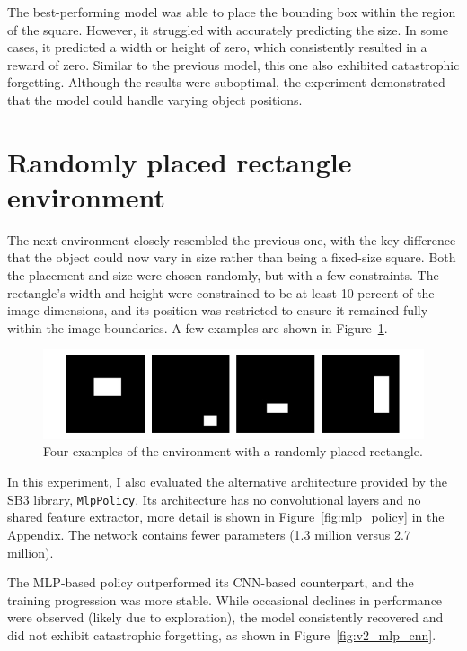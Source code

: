 \documentclass[
  digital,     %
  oneside,     %
  nosansbold,  %
  nocolorbold, %
  lof,         %
  lot,         %
]{fithesis4}
\begin{document}
The best-performing model was able to place the bounding box within the region of the square. However, it struggled with accurately predicting the size. In some cases, it predicted a width or height of zero, which consistently resulted in a reward of zero. Similar to the previous model, this one also exhibited catastrophic forgetting. Although the results were suboptimal, the experiment demonstrated that the model could handle varying object positions.

\section{Randomly placed rectangle environment}
\label{sec:moving_rectangle}
The next environment closely resembled the previous one, with the key difference that the object could now vary in size rather than being a fixed-size square. Both the placement and size were chosen randomly, but with a few constraints. The rectangle’s width and height were constrained to be at least 10 percent of the image dimensions, and its position was restricted to ensure it remained fully within the image boundaries. A few examples are shown in Figure~\ref{fig:env2}.

\begin{figure}
    \includegraphics[width=1\linewidth]{env_examples/env2.pdf}
    \caption{Four examples of the environment with a randomly placed rectangle.}
    \label{fig:env2}
\end{figure}

In this experiment, I also evaluated the alternative architecture provided by the SB3 library, \texttt{MlpPolicy}. Its architecture has no convolutional layers and no shared feature extractor, more detail is shown in Figure~\ref{fig:mlp_policy} in the Appendix. The network contains fewer parameters (1.3 million versus 2.7 million).

The MLP-based policy outperformed its CNN-based counterpart, and the training progression was more stable. While occasional declines in performance were observed (likely due to exploration), the model consistently recovered and did not exhibit catastrophic forgetting, as shown in Figure~\ref{fig:v2_mlp_cnn}.
\end{document}
